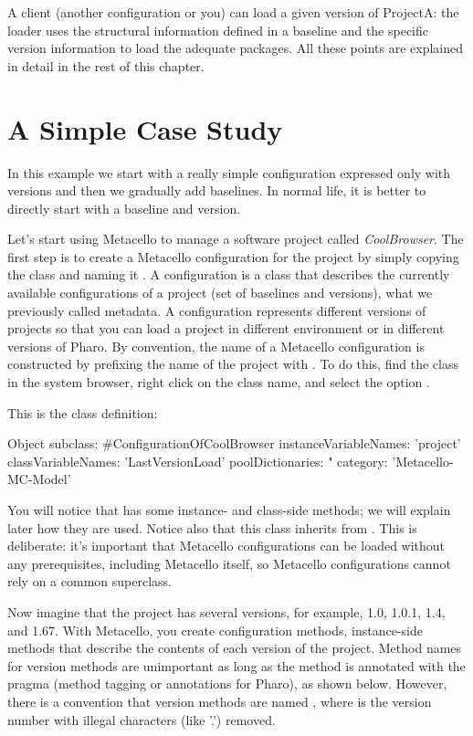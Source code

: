 \documentclass[a4paper,10pt,twoside]{book}
\begin{document}
A client (another configuration or you) can load a given version of ProjectA: the loader uses the structural information defined in a baseline and the specific version information to load the adequate packages. All these points are explained in detail in the rest of this chapter. 



\section{A Simple Case Study}

In this example we start with a really simple configuration expressed only with versions and then we gradually add baselines. In normal life, it is better to directly start with a baseline and version. 

Let's start using Metacello to manage a software project called \emph{CoolBrowser}. The first step is to create a Metacello configuration for the project by simply copying the class  and naming it . A configuration is a class that describes the currently available configurations of a project (set of baselines and versions), \ie what we previously called metadata. A configuration represents different versions of projects so that you can load a project in different environment or in different versions of Pharo. 
By convention, the name of a Metacello configuration is constructed by prefixing the name of the project with . To do this, find the class  in the system browser, right click on the class name, and select the option . 

This is the class definition:
\begin{code}{}
Object subclass: #ConfigurationOfCoolBrowser
       instanceVariableNames: 'project'
       classVariableNames: 'LastVersionLoad'
       poolDictionaries: "
       category: 'Metacello-MC-Model'
\end{code}

You will notice that  has some instance- and class-side methods; we will explain later how they are used. Notice also that this class inherits from .  This is deliberate: it's important that Metacello configurations can be loaded without any prerequisites, including Metacello itself, so Metacello configurations cannot rely on a common superclass.

Now imagine that the project  has several versions, for example, 1.0, 1.0.1, 1.4, and 1.67. 
With Metacello, you create configuration methods, instance-side methods that describe the contents of each version of the project. Method names for version methods are unimportant as long as the method is annotated with the  pragma (method tagging or annotations for Pharo), as shown below.  However, there is a  convention that  version methods are named , where  is the version number with illegal characters (like '.') removed.
\end{document}
